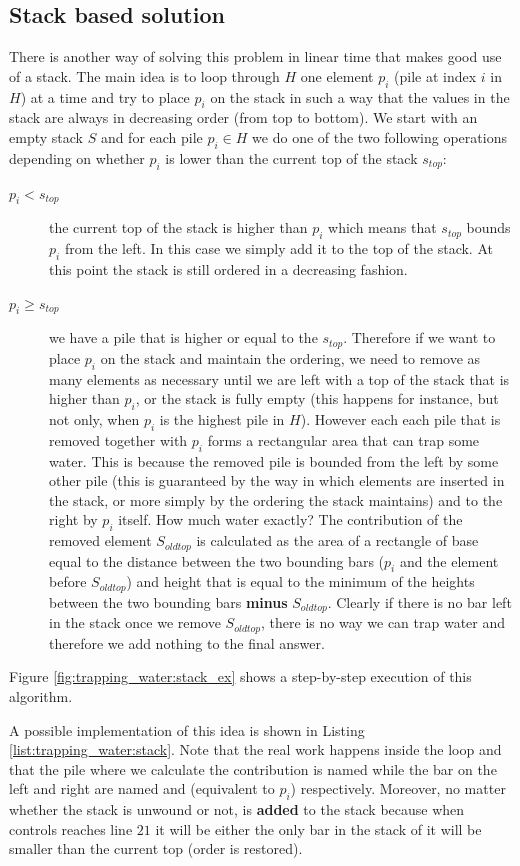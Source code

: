 \subsection{Stack based solution}
\label{trapping_water:sec:stack}
There is another way of solving this problem in linear time that makes good use of a stack. The main idea is to loop through $H$ one element $p_i$ (pile at index $i$ in $H$) at a time and try to place $p_i$ on the stack in such a way that the values in the stack are always in decreasing order (from top to bottom).
We start with an empty stack $S$ and for each pile $p_i \in H$ we do one of the two following operations depending on whether $p_i$  is lower than the current top of the stack $s_{top}$:
\begin{description}
	\item[$p_i < s_{top}$] the current top of the stack is higher than $p_i$ which means that $s_{top}$ bounds $p_i$ from the left. In this case we simply add it to the top of the stack. At this point the stack is still ordered in a decreasing fashion.
	\item[$p_i \geq s_{top}$] we have a pile that is higher or equal to the $s_{top}$. Therefore if we want to place $p_i$ on the stack and maintain the ordering, we need to remove as many elements as necessary until we are left with a top of the stack that is higher than $p_i$, or the stack is fully empty (this happens for instance, but not only, when $p_i$ is the highest pile in $H$).
	However each each pile that is removed together with $p_i$  forms a rectangular area that can trap some water. This is because the removed pile is bounded from the left by some other pile (this is guaranteed by the way in which  elements are inserted in the stack, or more simply by the ordering the stack maintains) and to the right by $p_i$ itself. 
	How much water exactly? 
	The contribution of the removed element $S_{oldtop}$ is calculated as the area of a rectangle of base equal to the distance between the two bounding bars ($p_i$ and the element before $S_{oldtop}$)  and height that is equal to the minimum of the heights between the two bounding bars \textbf{minus} $S_{oldtop}$. Clearly if there is no bar left in the stack once we remove $S_{oldtop}$, there is no way we can trap water and therefore we add nothing to the final answer. 
\end{description}
Figure \ref{fig:trapping_water:stack_ex} shows a step-by-step  execution of this algorithm.

A possible implementation of this idea is shown in Listing \ref{list:trapping_water:stack}.
Note that the real work happens inside the  loop and that the pile where we calculate the contribution is named  while the bar on the left and right are named  and  (equivalent to $p_i$) respectively. 
Moreover, no matter whether the stack is unwound or not,  is \textbf{added} to the stack because when controls reaches line $21$ it will be either the only bar in the stack of it will be smaller than the current top (order is restored).



